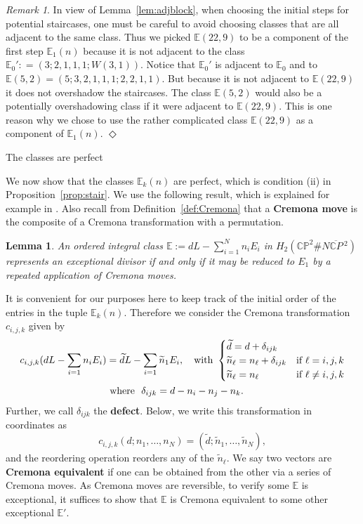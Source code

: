 \documentclass[11pt, reqno]{amsart}
\makeatletter
\def\subsection{\@startsection{subsection}{2}%
  \z@{.75\linespacing\@plus.7\linespacing}{-.5em}%
  {\normalfont\large\bfseries}}
\newtheorem{lemma}[thm]{Lemma}
\theoremstyle{remark}
\numberwithin{equation}{subsection}
\numberwithin{figure}{section}
\theoremstyle{customremark}
\newtheorem{rmk_no_diamond}[thm]{Remark}
\newenvironment{rmk}{\begin{rmk_no_diamond} } {\hfill$\er$ \end{rmk_no_diamond}}
\newcommand{\bE}{{\mathbb E}}
\newcommand{\er}{{\Diamond}}
\newcommand{\C}{\mathbb{C}}
\newcommand{\CP}{\mathbb{CP}}
\newcommand{\oCP}{{\overline{{\C}P}}\!\,}
\makeatother
\begin{document}
\begin{rmk}\label{rmk:over} \rm In view of Lemma~\ref{lem:adjblock}, when choosing the initial steps for potential staircases, one must be careful to avoid 
choosing classes that are all adjacent to the same class. Thus we picked $\bE(22,9)$ to be a component of the first step $\bE_1(n)$
because it is not adjacent to  the class $\bE_0': = (3;2,1,1,1; W(3,1))$. Notice that  $\bE_0'$ is  adjacent to $\bE_0$ and to $\bE(5,2) = (5;3,2,1,1,1; 2,2,1,1)$. But because it is not  adjacent to $\bE(22,9)$ it does not overshadow the staircases. 
 The class
$\bE(5,2)$ would also be a potentially overshadowing class  if it were adjacent to $\bE(22,9)$.
This is one reason why we chose to use the rather complicated class  $\bE(22,9)$ as a component of $\bE_1(n)$.
\end{rmk}


\subsection{The classes are perfect} \label{ss:perf}

We now show that the classes $\bE_k(n)$ are perfect, which is condition (ii) in Proposition~\ref{prop:stair}.
We use the following result, which is explained for example in \cite[Prop 1.2.12]{ball}. 
Also recall from Definition~\ref{def:Cremona} that a {\bf Cremona move} is the composite of a Cremona transformation with a permutation. 

\begin{lemma}
    An ordered integral class $\bE:=dL-\sum_{i=1}^N n_iE_i$ in $H_2(\CP^2 \# N\oCP^2)$ represents an exceptional divisor if and only if it may be reduced to $E_1$ by a repeated application of Cremona moves. 
\end{lemma}

It is convenient for our purposes here to keep track of  the initial order of the entries in the tuple $\bE_k(n)$. Therefore
we consider the Cremona transformation $c_{i,j,k}$ given by
\begin{align} c_{i,j,k}(dL-\sum_{i=1} n_iE_i)&=\widetilde{d}L-\sum_{i=1} \widetilde{n}_1E_i, \quad \text{with }  \begin{cases} \widetilde{d}= d+\delta_{ijk} \\ 
\widetilde{n}_\ell =n_\ell+\delta_{ijk} & \text{if $\ell=i,j,k$}\\
\widetilde{n}_\ell=n_\ell & \text{if $\ell \neq i,j,k$}
\end{cases}  \\ \notag
&\mbox{ where } \ \delta_{ijk}=d-n_i-n_j-n_k.
\end{align}
Further, we call 
 $\delta_{ijk}$  the \textbf{defect}. 
 Below, we write this transformation in coordinates as $$
 c_{i,j,k}(d;n_1,\hdots,n_N)=(\widetilde{d};\widetilde{n}_1,\hdots,\widetilde{n}_N),
 $$
  and the reordering operation reorders any of the $\widetilde{n}_\ell.$
We say two vectors are {\bf Cremona equivalent} if one can be obtained from the other via a series of Cremona moves. As Cremona moves are reversible, to verify some $\bE$ is exceptional, it suffices to show that $\bE$ is Cremona equivalent to some other exceptional $\bE'$.  
\end{document}
